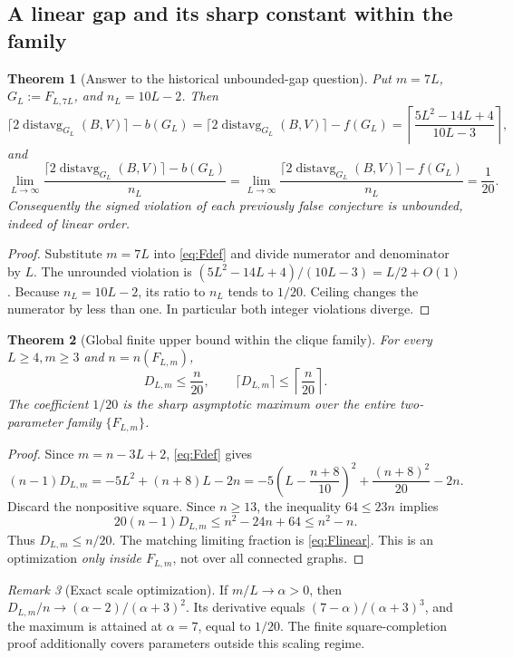 \documentclass[11pt,a4paper]{article}
\newtheorem{theorem}{Theorem}[section]
\theoremstyle{definition}
\theoremstyle{remark}
\newtheorem{remark}[theorem]{Remark}
\newcommand{\avg}{\operatorname{distavg}}
\begin{document}
\subsection{A linear gap and its sharp constant within the family}
\begin{theorem}[Answer to the historical unbounded-gap question]\label{thm:Funbounded}
Put $m=7L$, $G_L:=F_{L,7L}$, and $n_L=10L-2$. Then
\[
\lceil 2\avg_{G_L}(B,V)\rceil-b(G_L)
=\lceil 2\avg_{G_L}(B,V)\rceil-f(G_L)
=\left\lceil\frac{5L^2-14L+4}{10L-3}\right\rceil,
\]
and
\begin{equation}\label{eq:Flinear}
\lim_{L\to\infty}\frac{\lceil2\avg_{G_L}(B,V)\rceil-b(G_L)}{n_L}
=\lim_{L\to\infty}\frac{\lceil2\avg_{G_L}(B,V)\rceil-f(G_L)}{n_L}
=\frac1{20}.
\end{equation}
Consequently the signed violation of each previously false conjecture is unbounded, indeed of linear order.
\end{theorem}
\begin{proof}
Substitute $m=7L$ into \eqref{eq:Fdef} and divide numerator and denominator by $L$. The unrounded violation is $(5L^2-14L+4)/(10L-3)=L/2+O(1)$. Because $n_L=10L-2$, its ratio to $n_L$ tends to $1/20$. Ceiling changes the numerator by less than one. In particular both integer violations diverge.
\end{proof}
\begin{theorem}[Global finite upper bound within the clique family]\label{thm:Fsharp}
For every $L\ge4,m\ge3$ and $n=n(F_{L,m})$,
\begin{equation}\label{eq:Fupper}
D_{L,m}\le\frac{n}{20},\qquad \lceil D_{L,m}\rceil\le\left\lceil\frac n{20}\right\rceil.
\end{equation}
The coefficient $1/20$ is the sharp asymptotic maximum over the entire two-parameter family $\{F_{L,m}\}$.
\end{theorem}
\begin{proof}
Since $m=n-3L+2$, \eqref{eq:Fdef} gives
\[
(n-1)D_{L,m}=-5L^2+(n+8)L-2n
=-5\left(L-\frac{n+8}{10}\right)^2+\frac{(n+8)^2}{20}-2n.
\]
Discard the nonpositive square. Since $n\ge13$, the inequality $64\le23n$ implies
\[
20(n-1)D_{L,m}\le n^2-24n+64\le n^2-n.
\]
Thus $D_{L,m}\le n/20$. The matching limiting fraction is \eqref{eq:Flinear}. This is an optimization \emph{only inside $F_{L,m}$}, not over all connected graphs.
\end{proof}
\begin{remark}[Exact scale optimization]
If $m/L\to\alpha>0$, then $D_{L,m}/n\to(\alpha-2)/(\alpha+3)^2$. Its derivative equals $(7-\alpha)/(\alpha+3)^3$, and the maximum is attained at $\alpha=7$, equal to $1/20$. The finite square-completion proof additionally covers parameters outside this scaling regime.
\end{remark}
\end{document}
